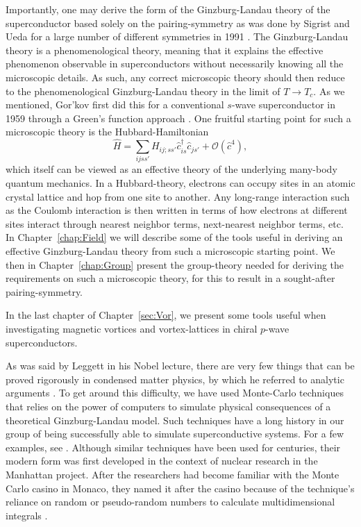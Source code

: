 Importantly, one may derive the form of the Ginzburg-Landau theory of the superconductor based solely on the pairing-symmetry as was done by Sigrist and Ueda
for a large number of different symmetries in 1991 \cite{SigristUeda91}. The Ginzburg-Landau theory is a
phenomenological theory, meaning that it explains the effective phenomenon observable in superconductors without necessarily knowing all the microscopic
details. As such, any correct microscopic theory should then reduce to the phenomenological Ginzburg-Landau theory in the limit of $T\to T_c$. As we mentioned,
Gor'kov first did this for a conventional $s$-wave superconductor in 1959 through a Green's function approach \cite{Gorkov59}. One fruitful
starting point for such a microscopic theory is the Hubbard-Hamiltonian
\begin{equation}
    \label{eq:Intro:HubbardHamiltonian}
    \hat{H} = \sum_{ijss'}H_{ij;ss'}\hat{c}_{is}^\dagger\hat{c}_{js'} + \mathcal{O}(\hat{c}^4),
\end{equation}
which itself can be viewed as an effective theory of the underlying many-body
quantum mechanics. In a Hubbard-theory, electrons can occupy sites in an atomic crystal lattice and hop from one site to another. Any long-range interaction
such as the Coulomb interaction is then written in terms
of how electrons at different sites interact through nearest neighbor terms, next-nearest neighbor terms, etc. In Chapter~\ref{chap:Field} we will describe some of the
tools useful in deriving an effective Ginzburg-Landau theory from such a microscopic starting point. We then in Chapter~\ref{chap:Group} present the
group-theory needed for deriving the requirements on such a microscopic theory, for this to result in a sought-after pairing-symmetry.

In the last chapter of Chapter~\ref{sec:Vor}, we present some tools useful when investigating magnetic vortices and vortex-lattices in chiral $p$-wave
superconductors.

As was said by Leggett in his Nobel lecture, there are very few things that can be proved rigorously in condensed matter physics, by which he referred to analytic
arguments \cite{Leggett03}. To get around this difficulty, we have used Monte-Carlo techniques that relies on the power of computers to simulate physical
consequences of a theoretical Ginzburg-Landau model. Such techniques have a long history in our group of being successfully
able to simulate superconductive systems. For a few examples, see \cite{Nguyen99PRB, Smiseth05, Smorgrav05, Bojesen14, Galteland15}. Although similar techniques
have been used for centuries, their modern form
was first developed in the context of nuclear research in the Manhattan project. After the researchers had become familiar with the Monte Carlo casino in Monaco,
they named it after the casino because of the technique's reliance on random or pseudo-random numbers to
calculate multidimensional integrals \cite{Metropolis87}.

